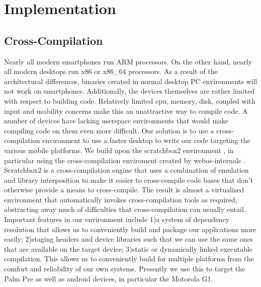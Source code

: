 \section{Implementation}
\label{sec:impl}
\subsection{Cross-Compilation}
Nearly all modern smartphones run ARM processors.  On the other hand, nearly all modern desktops run x86 or x86\_64 processors. As a result of the architectural differences, binaries created in normal desktop PC environments will not work on smartphones. Additionally, the devices themselves are rather limited with respect to building code.  Relatively limited cpu, memory, disk, coupled with input and usability concerns make this an unattractive way to compile code.  A number of devices have lacking userspace environments that would make compiling code on them even more difficult.
Our solution is to use a cross-compilation environment to use a faster desktop to write our code targeting the various mobile platforms.
We build upon the scratchbox2 environment \cite{sb2}, in particular using the cross-compilation enviroment created by webos-internals \cite{webosinterals}.\\

Scratchbox2 is a cross-compilation engine that uses a combination of emulation and library interposition to make it easier to cross-compile code bases that don't otherwise provide a means to cross-compile.
The result is almost a virtualized environment that automatically invokes cross-compilation tools as required, abstracting away much of difficulties that cross-compilation can usually entail.\\

Important features in our environment include 1)a system of dependency resolution that allows us to conveniently build and package our applications more easily; 2)staging headers and device libraries such that we can use the same ones that are available on the target device; 3)static or dynamically linked executable compilation.
This allows us to conveniently build for multiple platforms from the comfort and reliability of our own systems.  Presently we use this to target the Palm Pre as well as android devices, in particular the Motorola G1. \\

